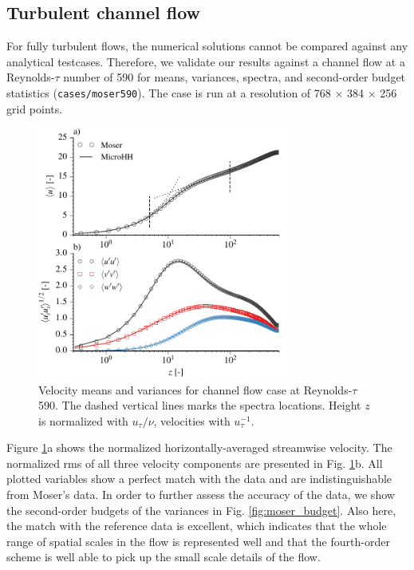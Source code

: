 \documentclass[gmd,manuscript]{copernicus}
\begin{document}
\subsection{Turbulent channel flow}
For fully turbulent flows, the numerical solutions cannot be compared against any analytical testcases. Therefore, we validate our results against a channel flow at a Reynolds-$\tau$  number of 590 \citep{Moser1999} for means, variances, spectra, and second-order budget statistics (\texttt{cases/moser590}). The case is run at a resolution of 768 $\times$ 384 $\times$ 256 grid points.
\begin{figure}[t]
	\vspace*{2mm}
	\begin{center}
		\includegraphics[width=8.3cm]{figs/gmd_m590_umean_var.pdf}
	\end{center}
	\caption{Velocity means and variances for \citet{Moser1999} channel flow case at Reynolds-$\tau$ 590. The dashed vertical lines marks the spectra locations. Height $z$ is normalized with $u_\tau / \nu$, velocities with $u_\tau^{-1}$.}\label{fig:moser_velocity}
\end{figure}

Figure \ref{fig:moser_velocity}a shows the normalized horizontally-averaged streamwise velocity. The normalized rms of all three velocity components are presented in Fig. \ref{fig:moser_velocity}b. All plotted variables show a perfect match with the data and are indistinguishable from Moser's data. In order to further assess the accuracy of the data, we show the second-order budgets of the variances in Fig. \ref{fig:moser_budget}. Also here, the match with the reference data is excellent, which indicates that the whole range of spatial scales in the flow is represented well and that the fourth-order scheme is well able to pick up the small scale details of the flow.
\end{document}
